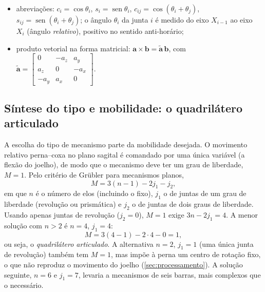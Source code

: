 \documentclass[12pt,a4paper,twoside]{article}
\DeclareMathOperator{\sen}{sen}
\newcommand{\Rmd}[2]{[{}^{#1}\dot R_{#2}]}             %
\newcommand{\Rmdd}[2]{[{}^{#1}\ddot R_{#2}]}
\newcommand{\Et}{\tilde{\mathbf k}}                   %
\newcommand{\Rm}[2]{[{}^{#1}R_{#2}]}                 %
\numberwithin{equation}{section}
\begin{document}
\begin{itemize}
  \begin{gather}
    \Rmd{A}{B} = \dot\gamma\begin{bmatrix} -\sen\gamma & -\cos\gamma \\ \cos\gamma & -\sen\gamma \end{bmatrix}
             = \dot\gamma\,\Rm{A}{B}\,\Et ,
    \qquad
    \Et = \begin{bmatrix} 0 & -1 \\ 1 & 0 \end{bmatrix},
    \label{eq:derivR}\\
    \Rmdd{A}{B} = \ddot\gamma\,\Rm{A}{B}\,\Et - \dot\gamma^2\,\Rm{A}{B} ;
  \end{gather}
  \item abreviações: $c_i = \cos\theta_i$, $s_i = \sen\theta_i$, $c_{ij} = \cos(\theta_i+\theta_j)$,
  $s_{ij} = \sen(\theta_i+\theta_j)$; o ângulo $\theta_i$ da junta $i$ é medido do eixo $X_{i-1}$ ao
  eixo $X_i$ (ângulo \emph{relativo}), positivo no sentido anti-horário;
  \item produto vetorial na forma matricial: $\mathbf a \times \mathbf b = \tilde{\mathbf a}\,\mathbf b$, com
  $\tilde{\mathbf a} = \begin{bmatrix} 0 & -a_z & a_y\\ a_z & 0 & -a_x\\ -a_y & a_x & 0\end{bmatrix}$.
\end{itemize}

\subsection{Síntese do tipo e mobilidade: o quadrilátero articulado}

A escolha do tipo de mecanismo parte da mobilidade desejada. O movimento relativo
perna--coxa no plano sagital é comandado por uma única variável (a flexão do joelho), de
modo que o mecanismo deve ter um grau de liberdade, $M = 1$. Pelo critério de Grübler para
mecanismos planos,
\begin{equation}
  M = 3(n-1) - 2j_1 - j_2 ,
\end{equation}
em que $n$ é o número de elos (incluindo o fixo), $j_1$ o de juntas de um grau de liberdade
(revolução ou prismática) e $j_2$ o de juntas de dois graus de liberdade. Usando apenas
juntas de revolução ($j_2 = 0$), $M = 1$ exige $3n - 2j_1 = 4$. A menor solução com $n > 2$ é
$n = 4$, $j_1 = 4$:
\begin{equation}
  M = 3(4-1) - 2\cdot 4 - 0 = 1 ,
\end{equation}
ou seja, o \emph{quadrilátero articulado}. A alternativa $n = 2$, $j_1 = 1$ (uma única junta de
revolução) também tem $M = 1$, mas impõe à perna um centro de rotação fixo, o que não
reproduz o movimento do joelho (\cref{sec:processamento}). A solução seguinte,
$n = 6$ e $j_1 = 7$, levaria a mecanismos de seis barras, mais complexos que o necessário.
\end{document}
